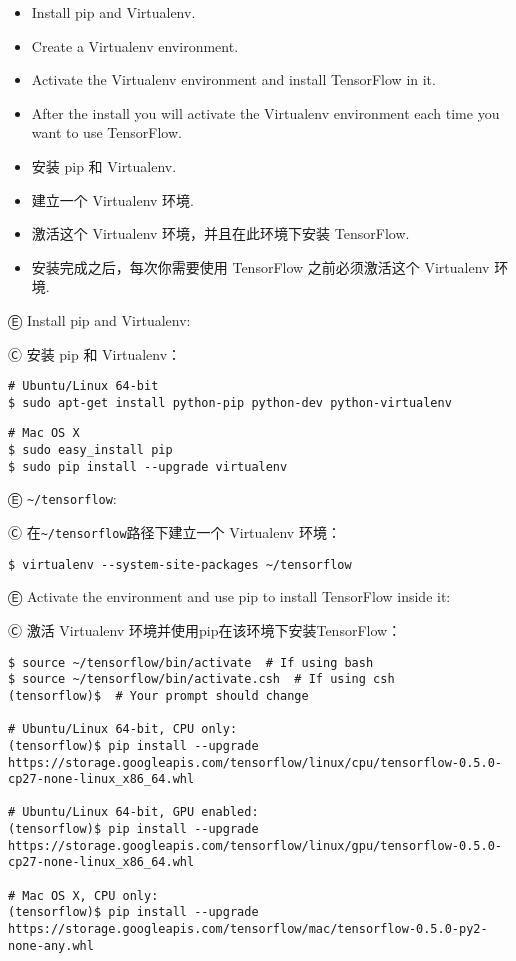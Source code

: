 \begin{itemize}
\item \textcolor{etc}{Install pip and Virtualenv.}
\item \textcolor{etc}{Create a Virtualenv environment.}
\item \textcolor{etc}{Activate the Virtualenv environment and install TensorFlow in it.}
\item \textcolor{etc}{After the install you will activate the Virtualenv environment each time you want to use TensorFlow.}
\item 安装 pip 和 Virtualenv.
\item 建立一个 Virtualenv 环境.
\item 激活这个 Virtualenv 环境，并且在此环境下安装 TensorFlow.
\item 安装完成之后，每次你需要使用 TensorFlow 之前必须激活这个 Virtualenv 环境.
\end{itemize}

Ⓔ \textcolor{etc}{Install pip and Virtualenv:}

Ⓒ 安装 pip 和 Virtualenv：

\begin{lstlisting}
# Ubuntu/Linux 64-bit
$ sudo apt-get install python-pip python-dev python-virtualenv
\end{lstlisting}

\begin{lstlisting}
# Mac OS X
$ sudo easy_install pip
$ sudo pip install --upgrade virtualenv
\end{lstlisting}

Ⓔ  \lstinline{~/tensorflow}:

Ⓒ 在\lstinline{~/tensorflow}路径下建立一个 Virtualenv 环境：

\begin{lstlisting}
$ virtualenv --system-site-packages ~/tensorflow
\end{lstlisting}

Ⓔ \textcolor{etc}{Activate the environment and use pip to install TensorFlow inside it:}

Ⓒ 激活 Virtualenv 环境并使用pip在该环境下安装TensorFlow：

\begin{lstlisting}
$ source ~/tensorflow/bin/activate  # If using bash
$ source ~/tensorflow/bin/activate.csh  # If using csh
(tensorflow)$  # Your prompt should change

# Ubuntu/Linux 64-bit, CPU only:
(tensorflow)$ pip install --upgrade https://storage.googleapis.com/tensorflow/linux/cpu/tensorflow-0.5.0-cp27-none-linux_x86_64.whl

# Ubuntu/Linux 64-bit, GPU enabled:
(tensorflow)$ pip install --upgrade https://storage.googleapis.com/tensorflow/linux/gpu/tensorflow-0.5.0-cp27-none-linux_x86_64.whl

# Mac OS X, CPU only:
(tensorflow)$ pip install --upgrade https://storage.googleapis.com/tensorflow/mac/tensorflow-0.5.0-py2-none-any.whl
\end{lstlisting}

